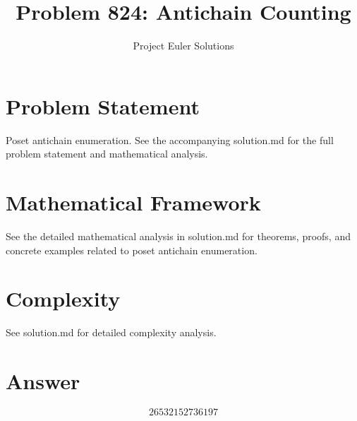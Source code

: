 \documentclass[11pt]{article}
\title{Problem 824: Antichain Counting}
\author{Project Euler Solutions}
\date{}
\begin{document}
\maketitle

\section{Problem Statement}

Poset antichain enumeration. See the accompanying solution.md for the full problem statement and mathematical analysis.

\section{Mathematical Framework}

See the detailed mathematical analysis in solution.md for theorems, proofs, and concrete examples related to poset antichain enumeration.

\section{Complexity}

See solution.md for detailed complexity analysis.

\section{Answer}

\[
\boxed{26532152736197}
\]
\end{document}
